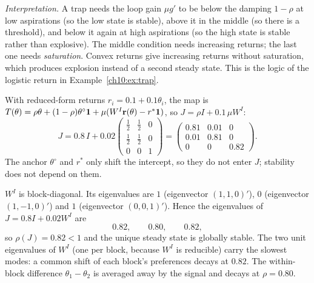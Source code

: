 \documentclass[../solutions_manual.tex]{subfiles}
\begin{document}
\textit{Interpretation.} A trap needs the loop gain $\mu g'$ to be below the damping $1 - \rho$ at low aspirations (so the low state is stable), above it in the middle (so there is a threshold), and below it again at high aspirations (so the high state is stable rather than explosive). The middle condition needs increasing returns; the last one needs \emph{saturation}. Convex returns give increasing returns without saturation, which produces explosion instead of a second steady state. This is the logic of the logistic return in Example~\ref{ch10:ex:trap}.

 With reduced-form returns $r_i = 0.1 + 0.1\theta_i$, the map is $T(\theta) = \rho\theta + (1-\rho)\theta^{\circ}\mathbf{1} + \mu(W^I\mathbf{r}(\theta) - r^*\mathbf{1})$, so $J = \rho I + 0.1\,\mu W^I$:
\[
J = 0.8\,I + 0.02\begin{pmatrix}\tfrac12 & \tfrac12 & 0 \\ \tfrac12 & \tfrac12 & 0 \\ 0 & 0 & 1\end{pmatrix}
= \begin{pmatrix} 0.81 & 0.01 & 0 \\ 0.01 & 0.81 & 0 \\ 0 & 0 & 0.82 \end{pmatrix}.
\]
The anchor $\theta^{\circ}$ and $r^*$ only shift the intercept, so they do not enter $J$; stability does not depend on them.

 $W^I$ is block-diagonal. Its eigenvalues are $1$ (eigenvector $(1,1,0)'$), $0$ (eigenvector $(1,-1,0)'$) and $1$ (eigenvector $(0,0,1)'$). Hence the eigenvalues of $J = 0.8I + 0.02W^I$ are
\[
0.82,\qquad 0.80,\qquad 0.82,
\]
so $\rho(J) = 0.82 < 1$ and the unique steady state is globally stable. The two unit eigenvalues of $W^I$ (one per block, because $W^I$ is reducible) carry the slowest modes: a common shift of each block's preferences decays at $0.82$. The within-block difference $\theta_1 - \theta_2$ is averaged away by the signal and decays at $\rho = 0.80$.
\end{document}
